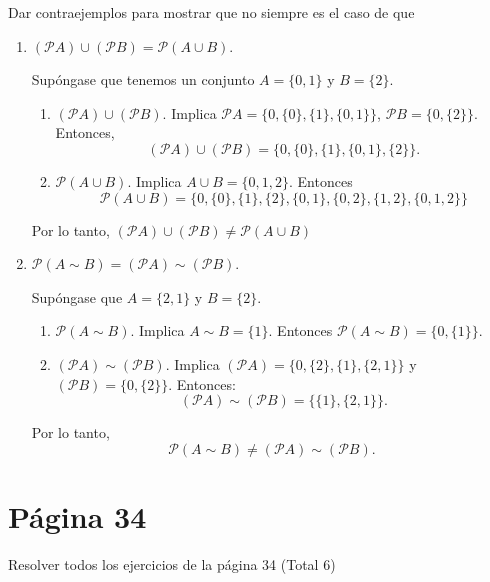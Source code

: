 	\begin{problema}
	Dar contraejemplos para mostrar que no siempre es el caso de que 
	\begin{enumerate}
		\item $(\mathcal{P}A)\cup (\mathcal{P}B)=\mathcal{P}(A\cup B)$.
		\begin{sol}
			Supóngase que tenemos un conjunto $A=\{0,1\}$ y $B=\{2\}$. 
			\begin{enumerate}
				\item $(\mathcal{P}A)\cup (\mathcal{P}B)$. Implica $\mathcal{P}A=\{0,\{0\}, \{1\}, \{0,1\}\}$, $\mathcal{P}B=\{0,\{2\}\}$. Entonces, $$(\mathcal{P}A)\cup (\mathcal{P}B)= \{0,\{0\}, \{1\}, \{0,1\}, \{2\}\}.$$
				\item $\mathcal{P}(A\cup B)$. Implica $A\cup B=\{0,1,2\}$. Entonces $$\mathcal{P}(A\cup B)= \{0, \{0\}, \{1\},\{2\},\{0,1\},\{0,2\},\{1,2\}, \{0,1,2\}\}$$
			\end{enumerate}
		Por lo tanto, $(\mathcal{P}A)\cup (\mathcal{P}B)\neq \mathcal{P}(A\cup B)$
		\end{sol}
		\item $\mathcal{P}(A \sim B)= (\mathcal{P}A)\sim (\mathcal{P}B)$.
		\begin{sol}
			Supóngase que $A=\{2,1\}$ y $B=\{2\}$. 
			\begin{enumerate}
				\item $\mathcal{P}(A \sim B)$. Implica $A\sim B= \{1\}$. Entonces $\mathcal{P}(A \sim B)=\{0,\{1\}\}$.
				\item $(\mathcal{P}A)\sim (\mathcal{P}B)$. Implica $(\mathcal{P}A)=\{0,\{2\},\{1\},\{2,1\} \}$ y $(\mathcal{P}B)=\{0,\{2\}\}$. Entonces: 
				$$(\mathcal{P}A)\sim (\mathcal{P}B)=\{\{1\},\{2,1\}\}.$$
			\end{enumerate}
		Por lo tanto, 
		$$\mathcal{P}(A \sim B)\neq (\mathcal{P}A)\sim (\mathcal{P}B).$$
		\end{sol}
	\end{enumerate}
\end{problema}


\section{Página 34}	
	Resolver todos los ejercicios de la página 34 (Total 6)
	

